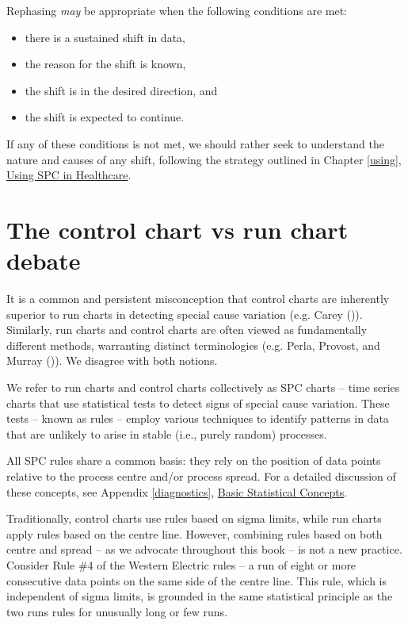 \documentclass[
]{book}
\providecommand{\tightlist}{%
  \setlength{\itemsep}{0pt}\setlength{\parskip}{0pt}}
\begin{document}
Rephasing \emph{may} be appropriate when the following conditions are met:

\begin{itemize}
\tightlist
\item
  there is a sustained shift in data,
\item
  the reason for the shift is known,
\item
  the shift is in the desired direction, and
\item
  the shift is expected to continue.
\end{itemize}

If any of these conditions is not met, we should rather seek to understand the nature and causes of any shift, following the strategy outlined in Chapter \ref{using}, \hyperref[using]{Using SPC in Healthcare}.

\section{The control chart vs run chart debate}\label{the-control-chart-vs-run-chart-debate}

It is a common and persistent misconception that control charts are inherently superior to run charts in detecting special cause variation (e.g. Carey ()). Similarly, run charts and control charts are often viewed as fundamentally different methods, warranting distinct terminologies (e.g. Perla, Provost, and Murray ()). We disagree with both notions.

We refer to run charts and control charts collectively as SPC charts -- time series charts that use statistical tests to detect signs of special cause variation. These tests -- known as rules -- employ various techniques to identify patterns in data that are unlikely to arise in stable (i.e., purely random) processes.

All SPC rules share a common basis: they rely on the position of data points relative to the process centre and/or process spread. For a detailed discussion of these concepts, see Appendix \ref{diagnostics}, \hyperref[stat-concepts]{Basic Statistical Concepts}.

Traditionally, control charts use rules based on sigma limits, while run charts apply rules based on the centre line. However, combining rules based on both centre and spread -- as we advocate throughout this book -- is not a new practice. Consider Rule \#4 of the Western Electric rules -- a run of eight or more consecutive data points on the same side of the centre line. This rule, which is independent of sigma limits, is grounded in the same statistical principle as the two runs rules for unusually long or few runs.
\end{document}
